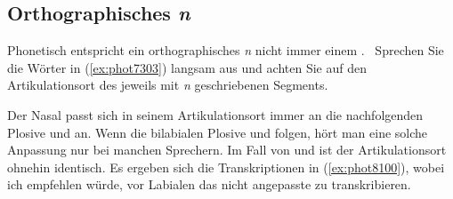 \begin{exe}
  \ex\label{ex:phot7772}
  \begin{xlist}
  \end{xlist}
\end{exe}

\subsection{Orthographisches \textit{n}}

\label{sec:orthographischesn}

Phonetisch entspricht ein orthographisches \textit{n} nicht immer einem \textipa{[n]}.
\TuBegin~Sprechen Sie die Wörter in (\ref{ex:phot7303}) langsam aus und achten Sie auf den Artikulationsort des jeweils mit \textit{n} geschriebenen Segments.

\begin{exe}
  \ex\label{ex:phot7303}
  \begin{xlist}
  \end{xlist}
\end{exe}

Der Nasal \textipa{[n]} passt sich in seinem Artikulationsort immer an die nachfolgenden Plosive \textipa{[k]} und \textipa{[g]} an.
Wenn die bilabialen Plosive \textipa{[p]} und \textipa{[b]} folgen, hört man eine solche Anpassung nur bei manchen Sprechern.
Im Fall von \textipa{[t]} und \textipa{[d]} ist der Artikulationsort ohnehin identisch.
Es ergeben sich die Transkriptionen in (\ref{ex:phot8100}), wobei ich empfehlen würde, vor Labialen das nicht angepasste \textipa{[n]} zu transkribieren.

\begin{exe}
  \ex\label{ex:phot8100}
  \begin{xlist}
    \ex{\textipa{[klINk@]}, \textipa{[baNk]}, \textipa{[PUNg@n\t{aO}]}}
  \end{xlist}
\end{exe}

